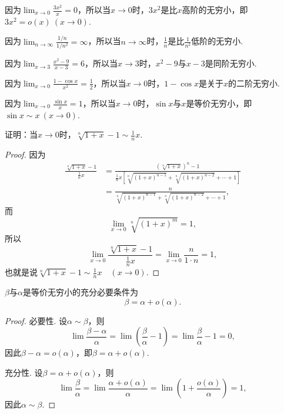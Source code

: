 \begin{example}
因为\(\lim_{x\to0} \frac{3x^2}{x} = 0\)，所以当\(x\to0\)时，\(3x^2\)是比\(x\)高阶的无穷小，即\(3x^2 = o(x)\ (x\to0)\).

因为\(\lim_{n\to\infty} \frac{1/n}{1/n^2} = \infty\)，所以当\(n\to\infty\)时，\(\frac{1}{n}\)是比\(\frac{1}{n^2}\)低阶的无穷小.

因为\(\lim_{x\to3} \frac{x^2-9}{x-3} = 6\)，所以当\(x\to3\)时，\(x^2-9\)与\(x-3\)是同阶无穷小.

因为\(\lim_{x\to0} \frac{1-\cos x}{x^2} = \frac{1}{2}\)，所以当\(x\to0\)时，\(1-\cos x\)是关于\(x\)的二阶无穷小.

因为\(\lim_{x\to0} \frac{\sin x}{x} = 1\)，所以当\(x\to0\)时，\(\sin x\)与\(x\)是等价无穷小，即\(\sin x \sim x\ (x\to0)\).
\end{example}

\begin{example}
证明：当\(x\to0\)时，\(\sqrt[n]{1+x} - 1 \sim \frac{1}{n} x\).
\begin{proof}
因为\begin{align*}
\frac{\sqrt[n]{1+x} - 1}{\frac{1}{n} x}
&= \frac{(\sqrt[n]{1+x})^n - 1}{\frac{1}{n} x \left[ \sqrt[n]{(1+x)^{n-1}} + \sqrt[n]{(1+x)^{n-2}} + \dotsb + 1 \right]} \\
&= \frac{n}{\sqrt[n]{(1+x)^{n-1}} + \sqrt[n]{(1+x)^{n-2}} + \dotsb + 1},
\end{align*}
而\[
\lim_{x\to0} \sqrt[n]{(1+x)^m} = 1,
\]所以\[
\lim_{x\to0} \frac{\sqrt[n]{1+x} - 1}{\frac{1}{n} x} = \lim_{x\to0} \frac{n}{1 \cdot n} = 1,
\]也就是说\(\sqrt[n]{1+x} - 1 \sim \frac{1}{n} x \quad(x\to0)\).
\end{proof}
\end{example}

\begin{theorem}\label{theorem:极限.无穷小的比较1}
\(\beta\)与\(\alpha\)是等价无穷小的充分必要条件为\[
	\beta=\alpha+o(\alpha).
\]
\begin{proof}
必要性.
设\(\alpha\sim\beta\)，则\[
	\lim\frac{\beta-\alpha}{\alpha}
	=\lim\left(\frac{\beta}{\alpha}-1\right)
	=\lim\frac{\beta}{\alpha}-1 = 0,
\]
因此\(\beta-\alpha=o(\alpha)\)，即\(\beta=\alpha+o(\alpha)\).

充分性.
设\(\beta=\alpha+o(\alpha)\)，则\[
	\lim\frac{\beta}{\alpha}
	=\lim\frac{\alpha+o(\alpha)}{\alpha}
	=\lim\left(1+\frac{o(\alpha)}{\alpha}\right) = 1,
\]
因此\(\alpha\sim\beta\).
\end{proof}
\end{theorem}

